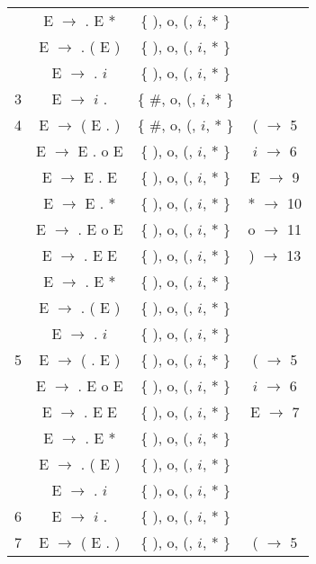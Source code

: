 \begin{center}
\begin{longtable}{r|ccc}
      &  E $\rightarrow$ . E *      & \{ ), o, (, $i$, * \} &               \\
      &  E $\rightarrow$ . ( E )  & \{ ), o, (, $i$, * \} &               \\
      &  E $\rightarrow$ . $i$        & \{ ), o, (, $i$, * \} &               \\
\hline
3     &  E $\rightarrow$ $i$ .        & \{ \#, o, (, $i$, * \}   &               \\
\hline
4     &  E $\rightarrow$ ( E . )  & \{ \#, o, (, $i$, * \}   &  (  $\rightarrow$  5   \\
      &  E $\rightarrow$ E . o E    & \{ ), o, (, $i$, * \} &  $i$  $\rightarrow$  6   \\
      &  E $\rightarrow$ E . E        & \{ ), o, (, $i$, * \} &   E   $\rightarrow$  9   \\
      &  E $\rightarrow$ E . *      & \{ ), o, (, $i$, * \} &  *  $\rightarrow$  10  \\
      &  E $\rightarrow$ . E o E    & \{ ), o, (, $i$, * \} &  o  $\rightarrow$  11  \\
      &  E $\rightarrow$ . E E        & \{ ), o, (, $i$, * \} &  )  $\rightarrow$  13  \\
      &  E $\rightarrow$ . E *      & \{ ), o, (, $i$, * \} &               \\
      &  E $\rightarrow$ . ( E )  & \{ ), o, (, $i$, * \} &               \\
      &  E $\rightarrow$ . $i$        & \{ ), o, (, $i$, * \} &               \\
\hline
5     &  E $\rightarrow$ ( . E )  & \{ ), o, (, $i$, * \} &  (  $\rightarrow$  5   \\
      &  E $\rightarrow$ . E o E    & \{ ), o, (, $i$, * \} &  $i$  $\rightarrow$  6   \\
      &  E $\rightarrow$ . E E        & \{ ), o, (, $i$, * \} &   E   $\rightarrow$  7   \\
      &  E $\rightarrow$ . E *      & \{ ), o, (, $i$, * \} &               \\
      &  E $\rightarrow$ . ( E )  & \{ ), o, (, $i$, * \} &               \\
      &  E $\rightarrow$ . $i$        & \{ ), o, (, $i$, * \} &               \\
\hline
6     &  E $\rightarrow$ $i$ .        & \{ ), o, (, $i$, * \} &               \\
\hline
7     &  E $\rightarrow$ ( E . )  & \{ ), o, (, $i$, * \} &  (  $\rightarrow$  5   \\

\end{longtable}
\end{center}
